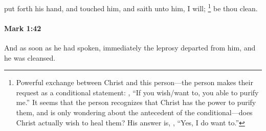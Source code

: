 			put forth his hand, and touched him, and saith unto him, I will;%
				\footnote{%
					Powerful exchange between Christ and this person---the person makes their request as a conditional statement: , ``If you wish/want to, you able to purify me.'' It seems that the person recognizes that Christ has the power to purify them, and is only wondering about the antecedent of the conditional---does Christ actually wish to heal them? His answer is, , ``Yes, I do want to.''
					}
			be thou clean.

			\begin{framed}
			\scriptsize
				\begin{compactdesc}
					\item[SBLG] 
				\end{compactdesc}
			\end{framed}

		\paragraph{Mark 1:42} %
			\label{MARK-1-42}

			And as soon as he had spoken, immediately the leprosy departed from him, and he was cleansed.

